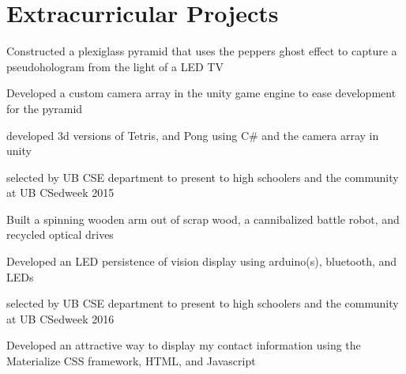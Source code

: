 \documentclass[]{deedy-resume-openfont}
\begin{document}
\begin{minipage}[t]{0.66\textwidth} 


\section{Extracurricular Projects}

\vspace{\topsep} %
\begin{tightemize}\item Constructed a plexiglass pyramid that uses the peppers ghost effect to capture a pseudohologram from the light of a LED TV \item Developed a custom camera array in the unity game engine to ease development for the pyramid \item developed 3d versions of Tetris, and Pong using C# and the camera array in unity \item selected by UB CSE department to present to high schoolers and the community at UB CSedweek 2015
\end{tightemize}
\sectionsep

\begin{tightemize}
\item Built a spinning wooden arm out of scrap wood, a cannibalized battle robot, and recycled optical drives\item Developed an LED persistence of vision display using arduino(s), bluetooth, and LEDs\item selected by UB CSE department to present to high schoolers and the community at UB CSedweek 2016 \end{tightemize}
\sectionsep

\begin{tightemize}
\item Developed an attractive way to display my contact information using the Materialize CSS framework, HTML, and Javascript\end{tightemize}
\sectionsep


\end{minipage}
\end{document}
